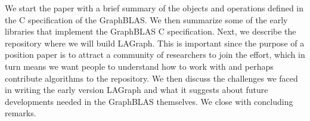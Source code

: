 We start the paper with a brief summary of the objects and operations defined in
the C specification of the GraphBLAS.  We then  summarize some of the 
early libraries that implement the GraphBLAS C specification.  Next, we describe
the repository where we will build LAGraph.  This is important since the
purpose of a position paper is to attract a community of researchers to join the effort,
which in turn means we want people to understand how to work with and perhaps contribute 
algorithms to the repository.  We then discuss the challenges we faced in writing the 
early version LAGraph and what it suggests about future developments needed in the
GraphBLAS themselves. We close with concluding remarks.














